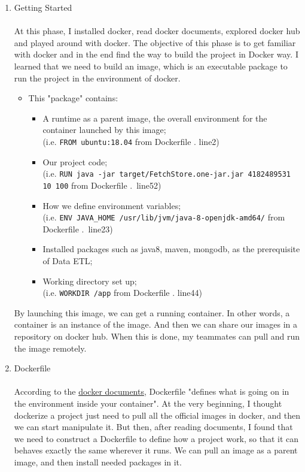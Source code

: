 \documentclass{article}
\newcommand{\codeinline}[1]{
    \texttt{#1}
}
\begin{document}
\begin{enumerate}
    \item Getting Started\\\\
    At this phase, I installed docker, read docker documents, explored docker hub and played around with docker. The objective of this phase is to get familiar with docker and in the end find the way to build the project in Docker way. I learned that we need to build an image, which is an executable package to run the project in the environment of docker.
    \begin{itemize}
        \item This "package" contains:
        \begin{itemize}
            \item A runtime as a parent image, the overall environment for the container launched by this image;\\(i.e.\codeinline{FROM ubuntu:18.04} from Dockerfile . line2)
            \item Our project code;\\ (i.e.\codeinline{RUN java -jar target/FetchStore.one-jar.jar 4182489531 10 100} from Dockerfile .\ line52)
            \item How we define environment variables;\\ (i.e. \codeinline{ENV JAVA_HOME /usr/lib/jvm/java-8-openjdk-amd64/} from Dockerfile .\ line23)
            \item Installed packages such as java8, maven, mongodb, as the prerequisite of Data ETL;
            \item Working directory set up;\\(i.e.\codeinline{WORKDIR /app} from Dockerfile . line44)
        \end{itemize}
    \end{itemize}

    By launching this image, we can get a running container. In other words, a container is an instance of the image. And then we can share our images in a repository on docker hub. When this is done, my teammates can pull and run the image remotely.\\

    \item Dockerfile\\\\
    According to the \href{https://docs.docker.com/}{docker documents}, Dockerfile "defines what is going on in the environment inside your container". At the very beginning, I thought dockerize a project just need to pull all the official images in docker, and then we can start manipulate it. But then, after reading documents, I found that we need to construct a Dockerfile to define how a project work, so that it can behaves exactly the same wherever it runs. We can pull an image as a parent image, and then install needed packages in it. \\


\end{enumerate}
\end{document}
